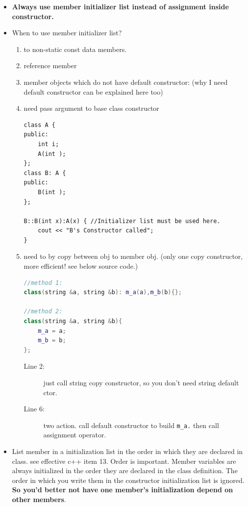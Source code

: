 \documentclass[a4paper,11pt,twoside]{book}
\begin{document}
\begin{itemize}
	\item \textbf{Always use member initializer list instead of assignment inside constructor.}
	
	\item When to use member initializer list?
	\begin{enumerate}
		\item to non-static const data members.
		\item reference member
		\item  member objects which do not have default constructor: (why I need default constructor can be explained here too)
		\item need pass argument to base class constructor
\begin{lstlisting}[numbers=none]
class A {
public:
	int i;
	A(int );
};
class B: A {
public:
	B(int );
};
	
B::B(int x):A(x) { //Initializer list must be used here.
    cout << "B's Constructor called";
}
\end{lstlisting}		
		
		\item need to by copy between obj to member obj. (only one copy constructor, more efficient! see below source code.)

\begin{lstlisting}[frame=single, language=c++]
//method 1:
class(string &a, string &b): m_a(a),m_b(b){};
		
//method 2:
class(string &a, string &b){   
	m_a = a;  
	m_b = b; 
};
\end{lstlisting}
	\begin{description}
		\item[Line 2:] just call string copy constructor, so you don't need string default ctor.
		\item[Line 6:] two action. call default constructor to build \texttt{m\_a.} then call assignment operator.
	\end{description}

	\end{enumerate}

	
	
	\item List member in a initialization list in the order in which they are declared in class. see effective c++ item 13. Order is important. Member variables are always initialized in the order they are declared in the class definition. The order in which you write them in the constructor initialization list is ignored.  \textbf{So you'd better not have one member's initialization depend on other members}.
	

\end{itemize}
\end{document}
